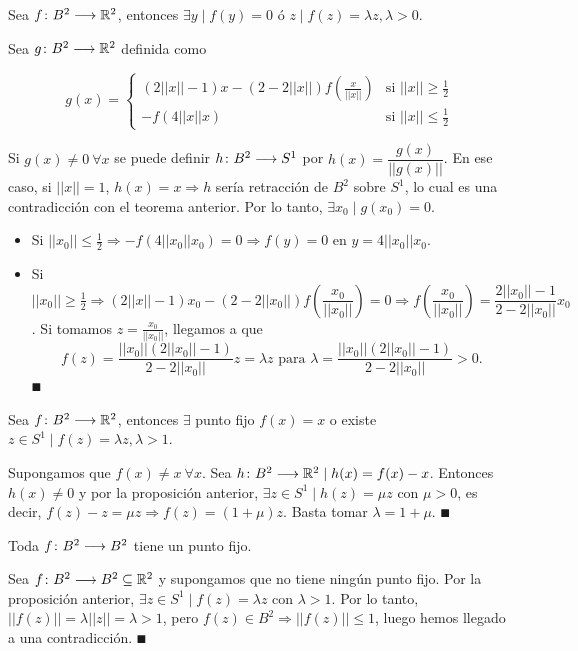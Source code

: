 \documentclass[GTS.tex]{subfiles}
\begin{document}
\begin{prop} Sea $f\colon{B^2}\longrightarrow{\mathbb{R}^2}$, entonces $\exists y\mid f(y)=0$ ó $z\mid f(z)=\lambda z, \lambda>0$.
\end{prop}
\begin{dem}
Sea $g\colon{B^2}\longrightarrow{\mathbb{R}^2}$ definida como

\[
g(x)=\begin{cases}
(2||x||-1)x-(2-2||x||)f\left(\frac{x}{||x||}\right) & \text{si  } ||x||\geq\frac{1}{2}\\
-f(4||x|| x) & \text{si  } ||x||\leq\frac{1}{2}
\end{cases}
\]

Si $g(x)\neq 0\ \forall x$ se puede definir $h\colon{B^2}\longrightarrow{S^1}$ por $h(x)=\dfrac{g(x)}{||g(x)||}$. En ese caso, si $||x||=1$, $h(x)=x\Rightarrow h$ sería retracción de $B^2$ sobre $S^1$, lo cual es una contradicción con el teorema anterior. Por lo tanto, $\exists x_0\mid g(x_0)=0$.
\begin{itemize}
\item Si $||x_0||\leq\frac{1}{2}\Rightarrow -f(4||x_0||x_0)=0\Rightarrow f(y)=0$ en $y=4||x_0||x_0$.
\item Si $||x_0||\geq\frac{1}{2}\Rightarrow (2||x||-1)x_0-(2-2||x_0||)f\left(\dfrac{x_0}{||x_0||}\right)=0\Rightarrow f\left(\dfrac{x_0}{||x_0||}\right)=\dfrac{2||x_0||-1}{2-2||x_0||}x_0$. Si tomamos $z=\frac{x_0}{||x_0||}$, llegamos a que
\[
f(z)=\dfrac{||x_0||(2||x_0||-1)}{2-2||x_0||}z=\lambda z \mbox{    para } \lambda=\dfrac{||x_0||(2||x_0||-1)}{2-2||x_0||}>0.
\]
 $\QED$
\end{itemize}
\end{dem}

\vspace{0.2cm}

\begin{prop} Sea $f\colon{B^2}\longrightarrow{\mathbb{R}^2}$, entonces $\exists$ punto fijo $f(x)=x$ o existe $z\in S^1 \mid f(z)=\lambda z, \lambda>1$.
\end{prop}
\begin{dem}
Supongamos que $f(x)\neq x\ \forall x$. Sea $h\colon{B^2}\longrightarrow{\mathbb{R}^2}\mid h(x)=f(x)-x$. Entonces $h(x)\neq 0$ y por la proposición anterior, $\exists z\in S^1\mid h(z)=\mu z$ con $\mu>0$, es decir, $f(z)-z=\mu z\Rightarrow f(z)=(1+\mu)z$. Basta tomar $\lambda=1+\mu$. $\QED$
\end{dem}

\vspace{0.2cm}

\begin{teorema} Toda $f\colon{B^2}\longrightarrow{B^2}$ tiene un punto fijo.
\end{teorema}
\begin{dem}
Sea $f\colon{B^2}\longrightarrow{B^2\subseteq\mathbb{R}^2}$ y supongamos que no tiene ningún punto fijo. Por la proposición anterior, $\exists z\in S^1\mid f(z)=\lambda z$ con $\lambda>1$. Por lo tanto, $||f(z)||=\lambda||z||=\lambda>1$, pero $f(z)\in B^2\Rightarrow||f(z)||\leq 1$, luego hemos llegado a una contradicción. $\QED$
\end{dem}
\end{document}
